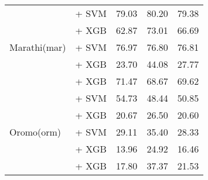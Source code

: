 \begin{longtable}{llccc}
    \midrule
    \multirow{5}{*}{Marathi(mar)}         & \citep{wang2024multilingual} + SVM                                 & 79.03                                & 80.20              & 79.38             \\
                                          & \citep{feng2022languageagnosticbertsentenceembedding} + XGB        & 62.87                                & 73.01              & 66.69             \\
                                          & \citep{feng2022languageagnosticbertsentenceembedding} + SVM        & 76.97                                & 76.80              & 76.81             \\
                                          & \citep{all-MiniLM-L12-v2} + XGB                                    & 23.70                                & 44.08              & 27.77             \\
                                          & \citep{sturua2024jinaembeddingsv3multilingualembeddingstask} + XGB & 71.47                                & 68.67              & 69.62             \\

    \midrule
    \multirow{5}{*}{Oromo(orm)}           & \citep{wang2024multilingual} + SVM                                 & 54.73                                & 48.44              & 50.85             \\
                                          & \citep{feng2022languageagnosticbertsentenceembedding} + XGB        & 20.67                                & 26.50              & 20.60             \\
                                          & \citep{feng2022languageagnosticbertsentenceembedding} + SVM        & 29.11                                & 35.40              & 28.33             \\
                                          & \citep{all-MiniLM-L12-v2} + XGB                                    & 13.96                                & 24.92              & 16.46             \\
                                          & \citep{sturua2024jinaembeddingsv3multilingualembeddingstask} + XGB & 17.80                                & 37.37              & 21.53             \\


\end{longtable}
